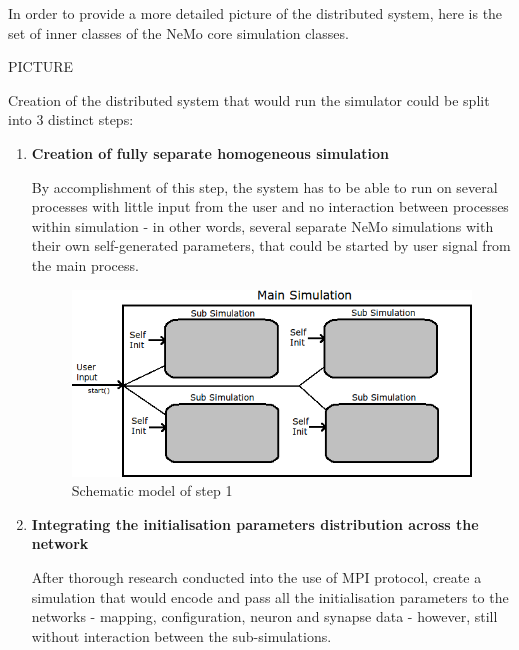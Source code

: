 In order to provide a more detailed picture of the distributed system, here is the set of inner classes of the NeMo core simulation classes.

PICTURE

Creation of the distributed system that would run the simulator could be split into 3 distinct steps:

\begin{enumerate}

\item{\textbf{Creation of fully separate homogeneous simulation}}

By accomplishment of this step, the system has to be able to run on several processes with little input from the user and no interaction between processes within simulation - in other words, several separate NeMo simulations with their own self-generated parameters, that could be started by user signal from the main process.

\begin{figure}[h]
\begin{center}
\includegraphics[scale = 0.25]{images/design_stage_1.png}
\end{center}
\caption{Schematic model of step 1}
\end{figure}

\item{\textbf{Integrating the initialisation parameters distribution across the network}}

After thorough research conducted into the use of MPI protocol, create a simulation that would encode and pass all the initialisation parameters to the networks - mapping, configuration, neuron and synapse data - however, still without interaction between the sub-simulations.


\end{enumerate}

